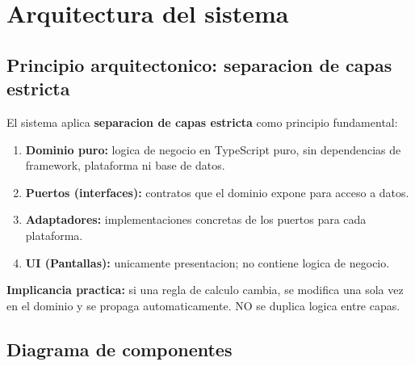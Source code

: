 \documentclass[11pt,a4paper,oneside]{report}
\begin{document}

\chapter{Arquitectura del sistema}

\section{Principio arquitectonico: separacion de capas estricta}

El sistema aplica \textbf{separacion de capas estricta} como principio fundamental:

\begin{enumerate}[leftmargin=*]
    \item \textbf{Dominio puro:} logica de negocio en TypeScript puro, sin dependencias de framework, plataforma ni base de datos.
    \item \textbf{Puertos (interfaces):} contratos que el dominio expone para acceso a datos.
    \item \textbf{Adaptadores:} implementaciones concretas de los puertos para cada plataforma.
    \item \textbf{UI (Pantallas):} unicamente presentacion; no contiene logica de negocio.
\end{enumerate}

\textbf{Implicancia practica:} si una regla de calculo cambia, se modifica una sola vez en el dominio y se propaga automaticamente. NO se duplica logica entre capas.

\section{Diagrama de componentes}
\end{document}
